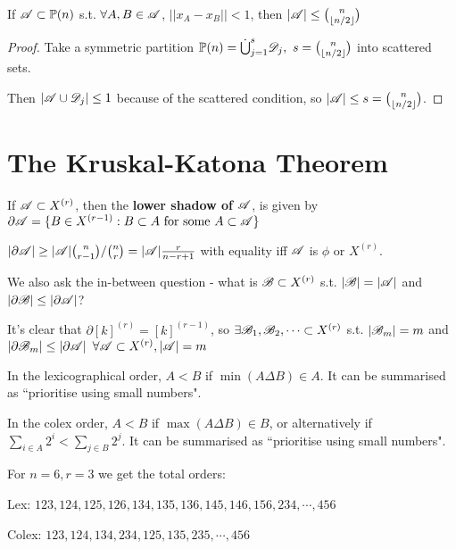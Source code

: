 \documentclass[a4paper]{article}
\begin{document}
\begin{thm-num}
	If $\mathscr{A}\subset\mathbb{P}(n)$ s.t. $\forall A,B\in\mathscr{A}$, $\left|\left|x_A - x_B\right|\right|<1$, then $|\mathscr{A}|\leq\binom{n}{\left\lfloor n/2\right\rfloor}$
\end{thm-num}
\begin{proof}
	Take a symmetric partition $\P(n)=\dot{\bigcup}_{j=1}^{s}\calD_j,\ s=\binom{n}{\lf n/2\rf}$ into scattered sets.
	
	Then $\left|\mathscr{A}\cup\mathscr{D}_j\right|\leq 1$ because of the scattered condition, so $|\mathscr{A}|\leq s=\binom{n}{\left\lfloor n/2\right\rfloor}$.
\end{proof}

\section{The Kruskal-Katona Theorem}
\begin{defi}
	If $\mathscr{A}\subset X^{(r)}$, then the \textbf{lower shadow of $\mathscr{A}$}, is given by $\partial\mathscr{A}=\{B\in X^{(r-1)}:B\subset A \textrm{ for some } A\subset\mathscr{A} \}$	
\end{defi}

\begin{fact}
	$|\partial\mathscr{A}|\geq|\mathscr{A}|\binom{n}{r-1}/\binom{n}{r}=|\mathscr{A}|\frac{r}{n-r+1}$ with equality iff $\mathscr{A}$ is $\phi$ or $X^{(r)}$.
\end{fact}

We also ask the in-between question - what is $\mathscr{B}\subset X^{(r)}$ s.t. $|\mathscr{B}|=|\mathscr{A}|$ and $|\partial\mathscr{B}|\leq|\partial\mathscr{A}|$?

It's clear that $\partial[k]^{(r)}=[k]^{(r-1)}$, so $\exists\mathscr{B}_1,\mathscr{B}_2,\cdots\subset X^{(r)}$ s.t. $|\mathscr{B}_m|=m$ and $\left|\partial\calB_m\right|\leq\left|\partial\calA\right|\ \forall\calA\subset X^{(r)}, |\calA|=m$

\begin{defi}
	In the lexicographical order, $A<B$ if $\min(A\Delta B)\in A$. It can be summarised as ``prioritise using small numbers".
\end{defi}
\begin{defi}
	In the colex order, $A<B$ if $\max(A\Delta B)\in B$, or alternatively if $\sum_{i\in A}2^i<\sum_{j\in B}2^j$. It can be summarised as ``prioritise using small numbers".
\end{defi}
\begin{eg}
	For $n=6,r=3$ we get the total orders:
	
	Lex: $123,124,125,126,134,135,136,145,146,156,234,\cdots, 456$
	
	Colex: $123,124,134,234,125,135,235,\cdots, 456$
\end{eg}

\printindex
\end{document}
